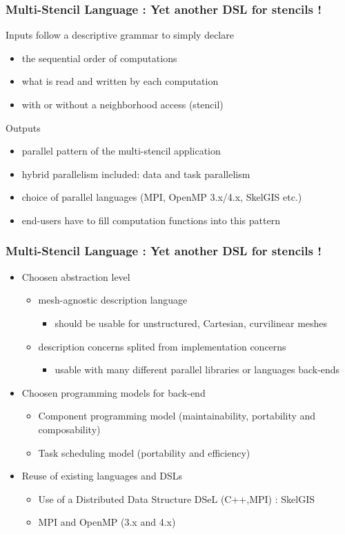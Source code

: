 \documentclass{beamer}
\begin{document}
\begin{frame}
\frametitle{Multi-Stencil Language : Yet another DSL for stencils !}
\begin{block}{Inputs}
follow a descriptive grammar to simply declare
\begin{itemize}
\item the sequential order of computations
\item what is read and written by each computation
\item with or without a neighborhood access (stencil)
\end{itemize}
\end{block}
\begin{block}{Outputs}
\begin{itemize}
\item parallel pattern of the multi-stencil application
\item hybrid parallelism included: data and task parallelism
\item choice of parallel languages (MPI, OpenMP 3.x/4.x, SkelGIS etc.)
\item end-users have to fill computation functions into this pattern
\end{itemize}
\end{block}
\end{frame}
\begin{frame}
\frametitle{Multi-Stencil Language : Yet another DSL for stencils !}
\begin{itemize}
\item Choosen abstraction level
\begin{itemize}
\item mesh-agnostic description language
\begin{itemize}
\item should be usable for unstructured, Cartesian, curvilinear meshes
\end{itemize}
\item description concerns splited from implementation concerns
\begin{itemize}
\item usable with many different parallel libraries or languages back-ends
\end{itemize}
\end{itemize}
\item Choosen programming models for back-end
\begin{itemize}
\item Component programming model (maintainability, portability and composability)
\item Task scheduling model (portability and efficiency)
\end{itemize}
\item Reuse of existing languages and DSLs
\begin{itemize}
\item Use of a Distributed Data Structure DSeL (C++,MPI) : SkelGIS
\item MPI and OpenMP (3.x and 4.x)
\end{itemize}
\end{itemize}
\end{frame}
\end{document}

